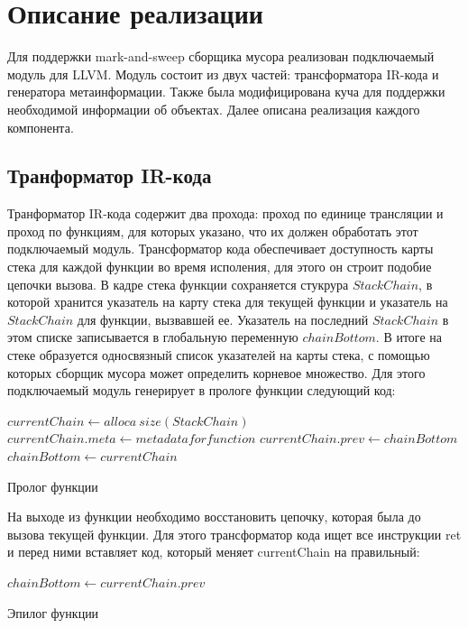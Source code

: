 \documentclass[14pt]{extarticle}
\begin{document}
\pagebreak
\section{Описание реализации}
Для поддержки mark-and-sweep сборщика мусора реализован подключаемый модуль для LLVM. Модуль состоит из двух частей: трансформатора IR-кода и генератора метаинформации. Также была модифицирована куча для поддержки необходимой информации об объектах. Далее описана реализация каждого компонента.
\subsection{Транформатор IR-кода}
Транформатор IR-кода содержит два прохода: проход по единице трансляции и проход по функциям, для которых указано, что их должен обработать этот подключаемый модуль. Трансформатор кода обеспечивает доступность карты стека для каждой функции во время исполения, для этого он строит подобие цепочки вызова. В кадре стека функции сохраняется стукрура $StackChain$, в которой хранится указатель на карту стека для текущей функции и указатель на $StackChain$ для функции, вызвавшей ее. Указатель на последний $StackChain$ в этом списке записывается в глобальную переменную $chainBottom$. В итоге на стеке образуется односвязный список указателей на карты стека, с помощью которых сборщик мусора может определить корневое множество.
Для этого подключаемый модуль генерирует в прологе функции следующий код:

\begin{algorithm}
\begin{algorithmic}[1]
\State $currentChain \gets alloca~size(StackChain)$
\State $currentChain.meta \gets metadata for function$
\State $currentChain.prev \gets chainBottom$
\State $chainBottom \gets currentChain$
\end{algorithmic}
\caption{Пролог функции}
\end{algorithm}

На выходе из функции необходимо восстановить цепочку, которая была до вызова текущей функции. Для этого трансформатор кода ищет все инструкции ret и перед ними вставляет код, который меняет currentChain на правильный:

\begin{algorithm}
\begin{algorithmic}[1]
\State $chainBottom \gets currentChain.prev$
\end{algorithmic}
\caption{Эпилог функции}
\end{algorithm}
\end{document}
